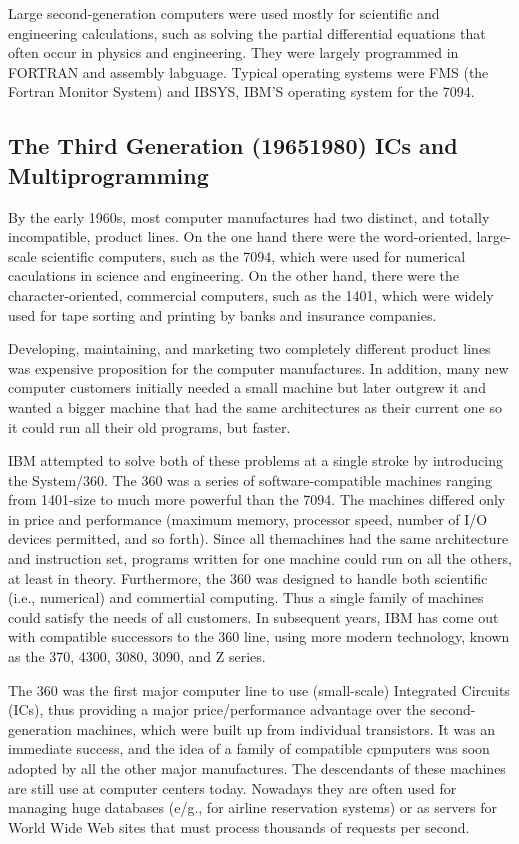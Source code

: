\documentclass{book}
\begin{document}
Large second-generation computers were used mostly for scientific and engineering calculations, 
such as solving the partial differential equations that often occur in physics and engineering.
They were largely programmed in FORTRAN and assembly labguage.
Typical operating systems were FMS (the Fortran Monitor System) and IBSYS, IBM'S operating system for the 7094.

\subsection{The Third Generation (19651980) ICs and Multiprogramming}
By the early 1960s, most computer manufactures had two distinct, and totally incompatible, product lines.
On the one hand there were the word-oriented, large-scale scientific computers, such as the 7094, 
which were used for numerical caculations in science and engineering.
On the other hand, there were the character-oriented, commercial computers, such as the 1401, 
which were widely used for tape sorting and printing by banks and insurance companies.

Developing, maintaining, and marketing two completely different product lines was expensive proposition for the computer manufactures.
In addition, many new computer customers initially needed a small machine but later outgrew it and wanted a bigger machine 
that had the same architectures as their current one so it could run all their old programs, but faster.

IBM attempted to solve both of these problems at a single stroke by introducing the System/360.
The 360 was a series of software-compatible machines ranging from 1401-size to much more powerful than the 7094.
The machines differed only in price and performance (maximum memory, processor speed, number of I/O devices permitted, and so forth).
Since all themachines had the same architecture and instruction set, programs written for one machine could run on all the others, at least in theory.
Furthermore, the 360 was designed to handle both scientific (i.e., numerical) and commertial computing.
Thus a single family of machines could satisfy the needs of all customers.
In subsequent years, IBM has come out with compatible successors to the 360 line, using more modern technology, 
known as the 370, 4300, 3080, 3090, and Z series.

The 360 was the first major computer line to use (small-scale) Integrated Circuits (ICs), 
thus providing a major price/performance advantage over the second-generation machines, which were built up from individual transistors.
It was an immediate success, and the idea of a family of compatible cpmputers was soon adopted by all the other major manufactures.
The descendants of these machines are still use at computer centers today.
Nowadays they are often used for managing huge databases (e/g., for airline reservation systems) 
or as servers for World Wide Web sites that must process thousands of requests per second.
\end{document}
